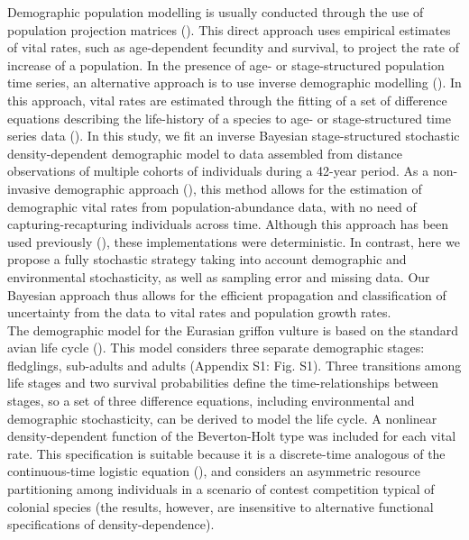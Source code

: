 \documentclass[12pt]{article}
\begin{document}
Demographic population modelling is usually conducted through the use of population projection matrices (\cite{Caswell2001}). This direct approach uses empirical estimates of vital rates, such as age-dependent fecundity and survival, to project the rate of increase of a population. In the presence of age- or stage-structured population time series, an alternative approach is to use inverse demographic modelling (\cite{Wood1997,Caswell2001}). In this approach, vital rates are estimated through the fitting of a set of difference equations describing the life-history of a species to age- or stage-structured time series data (\cite{Wood1994,Caswell2001,Gross2002,Wielgus2008}). In this study, we fit an inverse Bayesian stage-structured stochastic density-dependent demographic model to data assembled from distance observations of multiple cohorts of individuals during a 42-year period. As a non-invasive demographic approach (\cite{Wielgus2008}), this method allows for the estimation of demographic vital rates from population-abundance data, with no need of capturing-recapturing individuals across time. Although this approach has been used previously (\cite{Gross2002,Wielgus2008}), these implementations were deterministic. In contrast, here we propose a fully stochastic strategy taking into account demographic and environmental stochasticity, as well as sampling error and missing data. Our Bayesian approach thus allows for the efficient propagation and classification of uncertainty from the data to vital rates and population growth rates.\\

The demographic model for the Eurasian griffon vulture is based on the standard avian life cycle (\cite{Bennett2002}). This model considers three separate demographic stages: fledglings, sub-adults and adults (Appendix S1: Fig. S1). Three transitions among life stages and two survival probabilities define the time-relationships between stages, so a set of three difference equations, including environmental and demographic stochasticity, can be derived to model the life cycle. A nonlinear density-dependent function of the Beverton-Holt type was included for each vital rate. This specification is suitable because it is a discrete-time analogous of the continuous-time logistic equation (\cite{Bohner2007}), and considers an asymmetric resource partitioning among individuals in a scenario of contest competition typical of colonial species (the results, however, are insensitive to alternative functional specifications of density-dependence).
\end{document}

